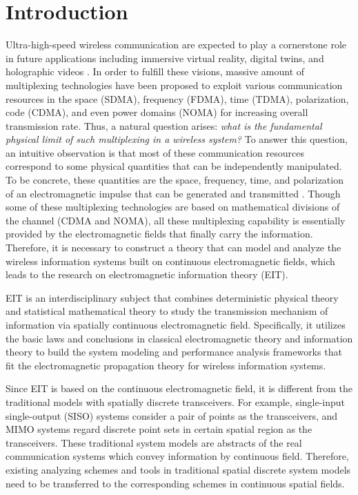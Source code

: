 \documentclass[journal,twocolumn]{IEEEtran}
\begin{document}
\section{Introduction}
Ultra-high-speed wireless communication are expected to play a cornerstone role in future applications including immersive virtual reality, digital twins, and holographic videos \cite{saad2019vision}. 
In order to fulfill these visions, massive amount of multiplexing technologies have been proposed to exploit various communication resources in the space (SDMA), frequency (FDMA), time (TDMA), polarization, code (CDMA), and even power domains (NOMA) for increasing overall transmission rate. 
Thus, a natural question arises: {\it what is the fundamental physical limit of such multiplexing in a wireless system?}
To answer this question, an intuitive observation is that most of these communication resources correspond to some physical quantities that can be independently manipulated. To be concrete, these quantities are the space, frequency, time, and polarization of an electromagnetic impulse that can be generated and transmitted \cite{shah2022survey}. Though some of these multiplexing technologies are based on mathematical divisions of the channel (CDMA and NOMA), all these multiplexing capability is essentially provided by the electromagnetic fields that finally carry the information. Therefore, it is necessary to construct a theory that can model and analyze the wireless information systems built on continuous electromagnetic fields, which leads to the research on electromagnetic information theory (EIT).

EIT is an interdisciplinary subject that combines deterministic physical theory and statistical mathematical theory to study the transmission mechanism of information via spatially continuous electromagnetic field. 
Specifically, it utilizes the basic laws and conclusions in classical electromagnetic theory and information theory to build the system modeling and performance analysis frameworks that fit the electromagnetic propagation theory for wireless information systems. 

Since EIT is based on the continuous electromagnetic field, it is different from the traditional models with spatially discrete transceivers. 
For example, single-input single-output (SISO) systems consider a pair of points as the transceivers, and MIMO systems regard discrete point sets in certain spatial region as the transceivers. These traditional system models are abstracts of the real communication systems which convey information by continuous field. Therefore, existing analyzing schemes and tools in traditional spatial discrete system models need to be transferred to the corresponding schemes in continuous spatial fields. 
\end{document}
